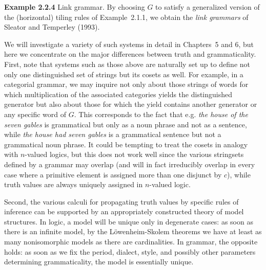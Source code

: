 \smallskip\noindent
{\bf Example 2.2.4} Link grammar. By choosing $G$ to satisfy a generalized
version of the (horizontal) tiling rules of Example~2.1.1, we obtain the {\it
link grammars}  of Sleator and Temperley (1993).
\nocite{Sleator:1993}

We will investigate a variety of such systems in detail in Chapters~5 and 6,
but here we concentrate on the major differences between truth and
grammaticality. First,
note that systems such as those above are naturally set up to define not only
one distinguished set of strings but its cosets as well. For example, in a
categorial grammar, we may inquire not only about those strings of words for
which multiplication of the associated categories yields the distinguished
generator but also about those for which the yield contains another generator
or any specific word of $G$. This corresponds to the fact that e.g. {\it the
  house of the seven gables} is grammatical but only as a noun phrase and not
as a sentence, while {\it the house had seven gables} is a grammatical
sentence but not a grammatical noun phrase. It could be tempting to treat the
cosets in analogy with $n$-valued logics, but this does not work well since
the various stringsets defined by a grammar may overlap (and will in fact
irreducibly overlap in every case where a primitive element is assigned more
than one disjunct by $c$), while truth values are always uniquely assigned in
$n$-valued logic.

Second, the various calculi for propagating truth values by specific rules of
inference can be supported by an appropriately constructed theory of model
structures. In logic, a model will be unique only in degenerate cases: as soon
as there is an infinite model, by the L\"{o}wenheim-Skolem theorems we have at
least as many nonisomorphic models as there are cardinalities. In grammar,
the opposite holds: as soon as we fix the period, dialect, style, and possibly
other parameters determining grammaticality, the model is essentially unique.

